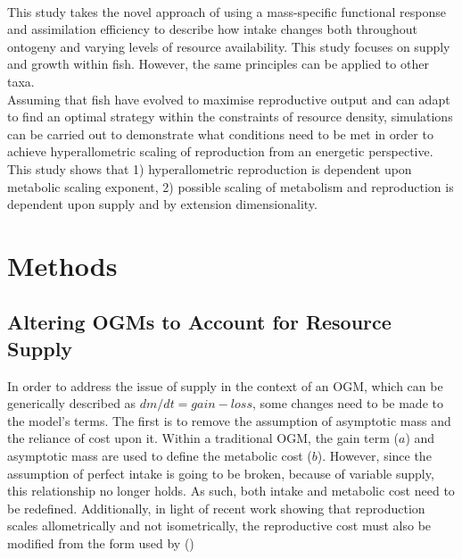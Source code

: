 \documentclass[a4paper, 11pt, hidelinks]{article} %
\begin{document}
	\\
	This study takes the novel approach of using a mass-specific functional response and assimilation efficiency to describe how intake changes both throughout ontogeny and varying levels of resource availability. This study focuses on supply and growth within fish. However, the same principles can be applied to other taxa.
	\\
	Assuming that fish have evolved to maximise reproductive output and can adapt to find an optimal strategy within the constraints of resource density, simulations can be carried out to demonstrate what conditions need to be met in order to achieve hyperallometric scaling of reproduction from an energetic perspective.  This study shows that 1) hyperallometric reproduction is dependent upon metabolic scaling exponent, %
	2) possible scaling of metabolism and reproduction is dependent upon supply and by extension dimensionality.

	\nolinenumbers
	
\section{Methods}
	\linenumbers
	
	\subsection{Altering OGMs to Account for Resource Supply}
	In order to address the issue of supply in the context of an OGM, which can be generically described as $dm/dt = gain - loss$, some changes need to be made to the model's terms.  The first is to remove the assumption of asymptotic mass and the reliance of cost upon it.  Within a traditional OGM, the gain term ($ a $) and asymptotic mass are used to define the metabolic cost ($ b $).  However, since the assumption of perfect intake is going to be broken, because of variable supply, this relationship no longer holds.  As such, both intake and metabolic cost need to be redefined.  Additionally, in light of recent work showing that reproduction scales allometrically and not isometrically, the reproductive cost must also be modified from the form used by \citeauthor{Charnov2001} (\citeyear{Charnov2001}) \parencite{Marshall2019, Barneche2018} 
	
\end{document}
